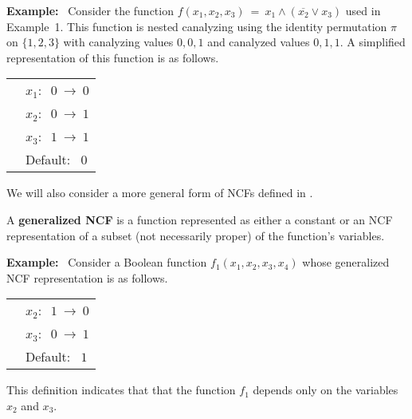 \medskip
\noindent
\textbf{Example:}~ Consider the function
$f(x_1, x_2, x_3) ~=~ x_1 \wedge (\overline{x_2} \vee x_3)$
used in Example~1.
This function is nested canalyzing using the identity permutation $\pi$ on $\{1,2,3\}$
with canalyzing values $0,0,1$ and canalyzed values $0, 1, 1$.
A simplified representation of this function is as follows.

\medskip

\noindent
\begin{tabular}{ll}
\hspace*{1.1in} & $x_1:~$  $0 ~\longrightarrow~ 0$ \\ [1ex]
\hspace*{1.1in} & $x_2:~$  $0 ~\longrightarrow~ 1$ \\ [1ex]
\hspace*{1.1in} & $x_3:~$  $1 ~\longrightarrow~ 1$ \\ [1ex]
\hspace*{1.1in} & Default:~ $0$ \\
\end{tabular}

\medskip

\noindent
We will also consider a more general form of NCFs defined in
\cite{Stearns-etal-2018}.

\begin{definition}\label{def:generalized ncf}
A {\bf generalized NCF} is a function represented as either a constant
or an NCF representation of a subset (not necessarily proper)
of the function's variables.
\end{definition}

\noindent
\textbf{Example:}~ Consider a Boolean function $f_1(x_1, x_2, x_3, x_4)$
whose generalized NCF representation is as follows.

\medskip

\noindent
\begin{tabular}{ll}
\hspace*{1.1in} & $x_2:~$  $1 ~\longrightarrow~ 0$ \\ [1ex]
\hspace*{1.1in} & $x_3:~$  $0 ~\longrightarrow~ 1$ \\ [1ex]
\hspace*{1.1in} & Default:~ $1$ \\
\end{tabular}

\smallskip

\noindent
This definition indicates that that the function $f_1$
depends only on the variables $x_2$ and $x_3$.

